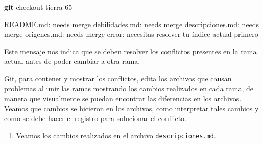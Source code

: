 \documentclass[
]{book}
\newenvironment{Shaded}{\begin{snugshade}}{\end{snugshade}}
\newcommand{\ExtensionTok}[1]{#1}
\newcommand{\FunctionTok}[1]{\textcolor[rgb]{0.13,0.29,0.53}{\textbf{#1}}}
\newcommand{\NormalTok}[1]{#1}
\providecommand{\tightlist}{%
  \setlength{\itemsep}{0pt}\setlength{\parskip}{0pt}}
\begin{document}
\begin{Shaded}
\begin{Highlighting}[]
\FunctionTok{git}\NormalTok{ checkout tierra{-}65}
\end{Highlighting}
\end{Shaded}

\begin{Shaded}
\begin{Highlighting}[]
\ExtensionTok{README.md:}\NormalTok{ needs merge}
\ExtensionTok{debilidades.md:}\NormalTok{ needs merge}
\ExtensionTok{descripciones.md:}\NormalTok{ needs merge}
\ExtensionTok{origenes.md:}\NormalTok{ needs merge}
\ExtensionTok{error:}\NormalTok{ necesitas resolver tu índice actual primero}
\end{Highlighting}
\end{Shaded}

Este mensaje nos indica que se deben resolver los conflictos presentes en la rama actual antes de poder cambiar a otra rama.

Git, para contener y mostrar los conflictos, edita los archivos que causan problemas al unir las ramas mostrando los cambios realizados en cada rama, de manera que visualmente se puedan encontrar las diferencias en los archivos.
Veamos que cambios se hicieron en los archivos, como interpretar tales cambios y como se debe hacer el registro para solucionar el conflicto.

\begin{enumerate}
\def\labelenumi{\arabic{enumi}.}
\setcounter{enumi}{6}
\tightlist
\item
  Veamos los cambios realizados en el archivo \texttt{descripciones.md}.
\end{enumerate}
\end{document}
